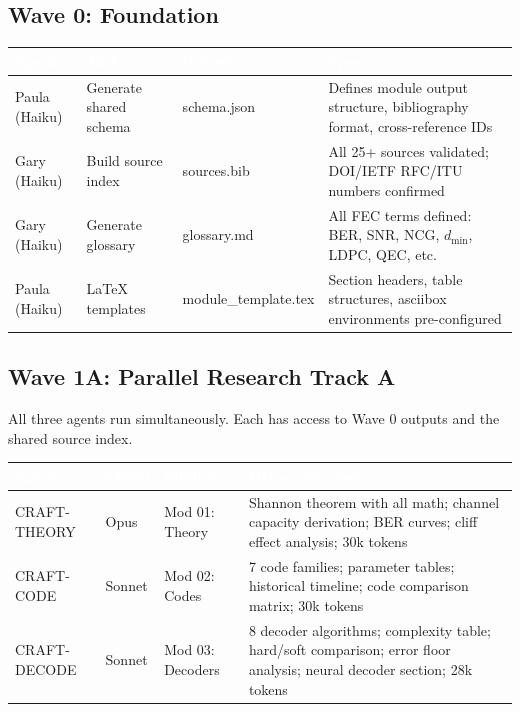 \documentclass[11pt,letterpaper]{article}
\newcommand{\tableheader}[1]{\textbf{\sffamily\textcolor{white}{#1}}}
\begin{document}
\subsection{Wave 0: Foundation}

\begin{center}
\begin{tabularx}{\textwidth}{L{2.5cm}L{2.5cm}L{2.8cm}X}
\toprule
{}
\tableheader{Agent} & \tableheader{Task} & \tableheader{Output} & \tableheader{Spec} \\
\midrule
Paula (Haiku) & Generate shared schema & schema.json & Defines module output structure, bibliography format, cross-reference IDs \\
Gary (Haiku) & Build source index & sources.bib & All 25+ sources validated; DOI/IETF RFC/ITU numbers confirmed \\
Gary (Haiku) & Generate glossary & glossary.md & All FEC terms defined: BER, SNR, NCG, $d_{\min}$, LDPC, QEC, etc. \\
Paula (Haiku) & LaTeX templates & module\_template.tex & Section headers, table structures, asciibox environments pre-configured \\
\bottomrule
\end{tabularx}
\end{center}

\subsection{Wave 1A: Parallel Research Track A}

All three agents run simultaneously. Each has access to Wave 0 outputs and the shared source index.

\begin{center}
\begin{tabularx}{\textwidth}{L{2.5cm}C{2cm}L{3cm}X}
\toprule
{}
\tableheader{Agent} & \tableheader{Model} & \tableheader{Module} & \tableheader{Deliverable Spec} \\
\midrule
CRAFT-THEORY & Opus & Mod 01: Theory & Shannon theorem with all math; channel capacity derivation; BER curves; cliff effect analysis; 30k tokens \\
CRAFT-CODE & Sonnet & Mod 02: Codes & 7 code families; parameter tables; historical timeline; code comparison matrix; 30k tokens \\
CRAFT-DECODE & Sonnet & Mod 03: Decoders & 8 decoder algorithms; complexity table; hard/soft comparison; error floor analysis; neural decoder section; 28k tokens \\
\bottomrule
\end{tabularx}
\end{center}
\end{document}
